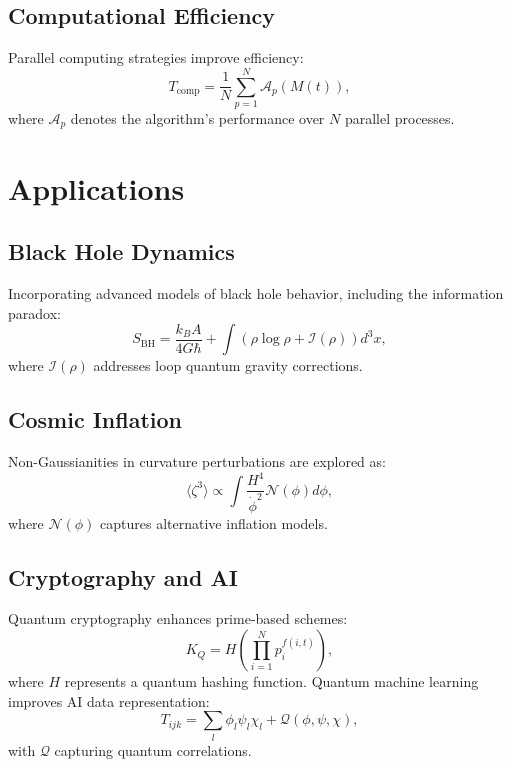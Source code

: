 \documentclass[12]{amsart}
\theoremstyle{plain}
\begin{document}
\subsection{Computational Efficiency}
Parallel computing strategies improve efficiency:
\begin{equation}
T_{\text{comp}} = \frac{1}{N} \sum_{p=1}^N \mathcal{A}_p(M(t)),
\end{equation}
where $\mathcal{A}_p$ denotes the algorithm's performance over $N$ parallel processes.

\section{Applications}

\subsection{Black Hole Dynamics}
Incorporating advanced models of black hole behavior, including the information paradox:
\begin{equation}
S_{\text{BH}} = \frac{k_B A}{4 G \hbar} + \int \left( \rho \log \rho + \mathcal{I}(\rho) \right) d^3x,
\end{equation}
where $\mathcal{I}(\rho)$ addresses loop quantum gravity corrections.

\subsection{Cosmic Inflation}
Non-Gaussianities in curvature perturbations are explored as:
\begin{equation}
\langle \zeta^3 \rangle \propto \int \frac{H^4}{\dot{\phi}^2} \mathcal{N}(\phi) d\phi,
\end{equation}
where $\mathcal{N}(\phi)$ captures alternative inflation models.

\subsection{Cryptography and AI}
Quantum cryptography enhances prime-based schemes:
\begin{equation}
K_Q = H\left( \prod_{i=1}^N p_i^{f(i,t)} \right),
\end{equation}
where $H$ represents a quantum hashing function. Quantum machine learning improves AI data representation:
\begin{equation}
T_{ijk} = \sum_{l} \phi_l \psi_l \chi_l + \mathcal{Q}(\phi, \psi, \chi),
\end{equation}
with $\mathcal{Q}$ capturing quantum correlations.
\end{document}
